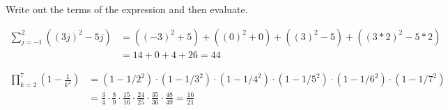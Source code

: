 Write out the terms of the expression and then evaluate.

\begin{questions}
    \begin{solution}
        \begin{align*}
            \sum_{j=-1}^2{\left((3j)^2-5j\right)} &=
            \left((-3)^2+5\right) +
            \left((0)^2+0\right) +
            \left((3)^2-5\right) +
            \left((3*2)^2-5*2\right)\\
            & = 14+0+4+26 = 44
        \end{align*}
    \end{solution}

    \begin{solution}
        \begin{align*}
            \prod_{k=2}^7{\left(1-\frac{1}{k^2}\right)} &=
            \left(1-1/2^2\right)\cdot
            \left(1-1/3^2\right)\cdot
            \left(1-1/4^2\right)\cdot
            \left(1-1/5^2\right)\cdot
            \left(1-1/6^2\right)\cdot
            \left(1-1/7^2\right)\\
            & = \frac{3}{4} \cdot
            \frac{8}{9} \cdot
            \frac{15}{16} \cdot
            \frac{24}{25} \cdot
            \frac{35}{36} \cdot
            \frac{48}{49}=\frac{16}{21}\\
        \end{align*}
    \end{solution}
\end{questions}